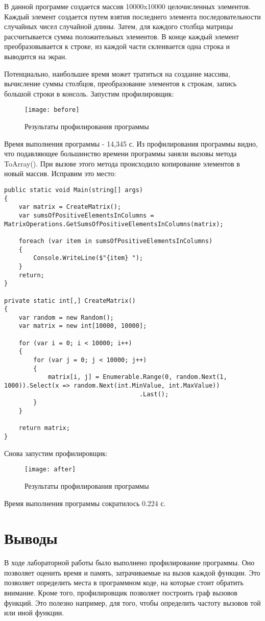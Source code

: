 \documentclass[a4paper,14pt]{extarticle}
\begin{document}
В данной программе создается массив 10000x10000 целочисленных элементов. Каждый элемент
создается путем взятия последнего элемента последовательности случайных чисел случайной
длины. Затем, для каждого столбца матрицы рассчитывается сумма положительных элементов.
В конце каждый элемент преобразовывается к строке, из каждой части склеивается одна строка
и выводится на экран.

Потенциально, наибольшее время может тратиться на создание массива, вычисление суммы столбцов,
преобразование элементов к строкам, запись большой строки в консоль. Запустим профилировщик:
\begin{figure}[H]
    \centering
    \texttt{[image: before]}
    \caption{Результаты профилирования программы}
    \label{fig:before}
\end{figure}

Время выполнения программы - 14,345 с. Из профилирования программы видно, что подавляющее большинство времени программы заняли
вызовы метода ToArray(). При вызове этого метода происходило копирование элементов в новый массив. Исправим это место:
\begin{lstlisting}
public static void Main(string[] args)
{
    var matrix = CreateMatrix();
    var sumsOfPositiveElementsInColumns = MatrixOperations.GetSumsOfPositiveElementsInColumns(matrix);

    foreach (var item in sumsOfPositiveElementsInColumns)
    {
        Console.WriteLine($"{item} ");
    }
    return;
}

private static int[,] CreateMatrix()
{
    var random = new Random();
    var matrix = new int[10000, 10000];

    for (var i = 0; i < 10000; i++)
    {
        for (var j = 0; j < 10000; j++)
        {
            matrix[i, j] = Enumerable.Range(0, random.Next(1, 1000)).Select(x => random.Next(int.MinValue, int.MaxValue))
                                     .Last();
        }
    }

    return matrix;
}
\end{lstlisting}

Снова запустим профилировщик:
\begin{figure}[H]
    \centering
    \texttt{[image: after]}
    \caption{Результаты профилирования программы}
    \label{fig:after}
\end{figure}

Время выполнения программы сократилось 0.224 с.

\section*{Выводы}
В ходе лабораторной работы было выполнено профилирование программы. Оно позволяет
оценить время и память, затрачиваемые на вызов каждой функции. Это позволяет
определить места в программном коде, на которые стоит обратить внимание. Кроме того,
профилировщик позволяет построить граф вызовов функций. Это полезно например, для того,
чтобы определить частоту вызовов той или иной функции.
\end{document}
